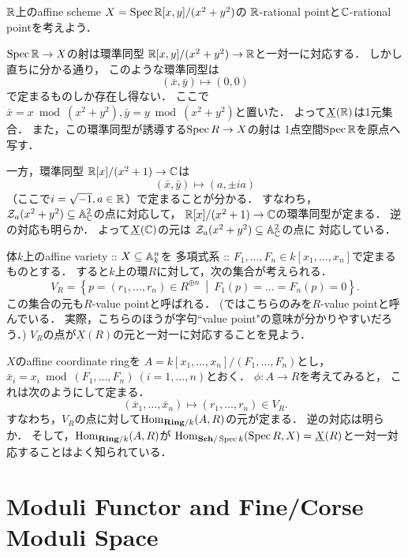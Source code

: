 \documentclass[a4paper]{jsarticle}
\newcommand{\Sch}{\mathbf{Sch}}
\newcommand{\Ring}{\mathbf{Ring}}
\newcommand{\func}[1]{\underline{#1}}
\begin{document}
    \begin{Example}
        $\mathbb{R}$上のaffine scheme $X=\operatorname{Spec} \mathbb{R}[x,y]/(x^2+y^2)$の
        $\mathbb{R}$-rational pointと$\mathbb{C}$-rational pointを考えよう．

        $\operatorname{Spec} \mathbb{R} \to X$の射は環準同型 $\mathbb{R}[x,y]/(x^2+y^2) \to \mathbb{R}$と一対一に対応する．
        しかし直ちに分かる通り，
        このような環準同型は
        \[ (\bar{x}, \bar{y}) \mapsto (0, 0) \]
        で定まるものしか存在し得ない．
        ここで$\bar{x}=x \bmod (x^2+y^2), \bar{y}=y \bmod (x^2+y^2)$と置いた．
        よって$\func{X}(\R)$は1元集合．
        また，この環準同型が誘導する$\operatorname{Spec} R \to X$の射は
        1点空間$\operatorname{Spec} \mathbb{R}$を原点へ写す．

        一方，環準同型 $\mathbb{R}[x]/(x^2+1) \to \mathbb{C}$は
        \[ (\bar{x}, \bar{y}) \mapsto (a, \pm ia) \]
        （ここで$i=\sqrt{-1}, a \in \mathbb{R}$）で定まることが分かる．
        すなわち，$\mathcal{Z}_a(x^2+y^2) \subseteq \mathbb{A}^2_{\mathbb{C}}$の点に対応して，
        $\mathbb{R}[x]/(x^2+1) \to \mathbb{C}$の環準同型が定まる．
        逆の対応も明らか．
        よって$\func{X}(\C)$の元は
        $\mathcal{Z}_a(x^2+y^2) \subseteq \mathbb{A}^2_{\mathbb{C}}$の点に
        対応している．
    \end{Example}

    \begin{Example}
        体$k$上のaffine variety :: 
        $X \subseteq \mathbb{A}^n_k$を
        多項式系 :: $F_1,\dots,F_n \in k[x_1,\dots,x_n]$で定まるものとする．
        すると$k$上の環$R$に対して，次の集合が考えられる．
        \[ V_R=\left\{ p=(r_1,\dots,r_n) \in R^{\oplus n} ~\middle|~ F_1(p)=\dots=F_n(p)=0 \right\}. \]
        この集合の元も$R$-value pointと呼ばれる．
        (\cite{Muk1}ではこちらのみを$R$-value pointと呼んでいる．
        実際，こちらのほうが字句``value point"の意味が分かりやすいだろう．)
        $V_R$の点が$\func{X}(R)$の元と一対一に対応することを見よう．

        $X$のaffine coordinate ringを
        $A=k[x_1,\dots,x_n]/(F_1,\dots,F_n)$とし，
        $\bar{x}_i=x_i \bmod (F_1,\dots,F_n) ~(i=1,\dots,n)$とおく．
        $\phi: A \to R$を考えてみると，
        これは次のようにして定まる．
        \[ (\bar{x}_1,\dots,\bar{x}_n) \mapsto (r_1,\dots,r_n) \in V_R. \]
        すなわち，$V_R$の点に対して$\Hom_{\Ring/k}(A,R)$の元が定まる．
        逆の対応は明らか．
        そして，$\Hom_{\Ring/k}(A,R)$が
        $\Hom_{\Sch/\Spec k}(\Spec R, X)=\func{X}(R)$と一対一対応することはよく知られている．
    \end{Example}

\section{Moduli Functor and Fine/Corse Moduli Space}
\end{document}
